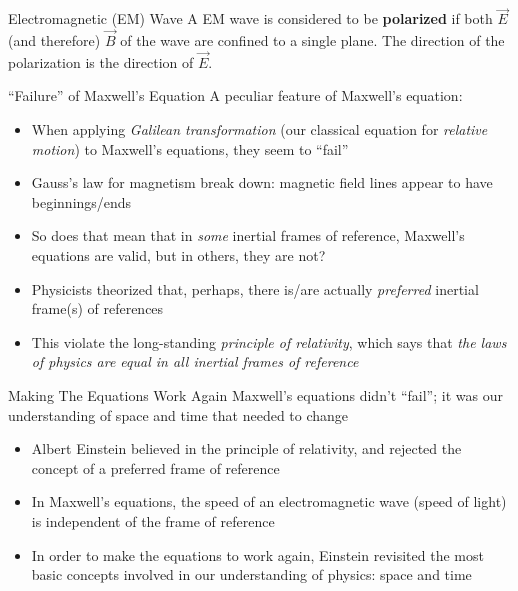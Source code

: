 \documentclass[12pt,aspectratio=169]{beamer}
\begin{document}
\begin{frame}{Electromagnetic (EM) Wave}
  A EM wave is considered to be \textbf{polarized} if both $\vec E$
  (and therefore) $\vec B$ of the wave are confined to a single plane. The
  direction of the polarization is the direction of $\vec E$.
  \begin{center}
  \end{center}
\end{frame}



\begin{frame}{``Failure'' of Maxwell's Equation}
  A peculiar feature of Maxwell's equation:
  \begin{itemize}
  \item When applying \emph{Galilean transformation} (our classical equation for
    \emph{relative motion}) to Maxwell's equations, they seem to ``fail''
  \item Gauss's law for magnetism break down: magnetic field lines appear to
    have beginnings/ends
  \item So does that mean that in \emph{some} inertial frames of reference,
    Maxwell's equations are valid, but in others, they are not?
  \item Physicists theorized that, perhaps, there is/are actually
    \emph{preferred} inertial frame(s) of references
  \item This violate the long-standing \emph{principle of relativity}, which
    says that \emph{the laws of physics are equal in all inertial frames of
      reference}
  \end{itemize}
\end{frame}



\begin{frame}{Making The Equations Work Again}
  Maxwell's equations didn't ``fail''; it was our understanding of space and
  time that needed to change
  \begin{itemize}
  \item Albert Einstein believed in the principle of relativity, and rejected
    the concept of a preferred frame of reference
  \item In Maxwell's equations, the speed of an electromagnetic wave (speed of
    light) is independent of the frame of reference
  \item In order to make the equations to work again, Einstein revisited the
    most basic concepts involved in our understanding of physics: space and
    time
  \end{itemize}
\end{frame}
\end{document}
